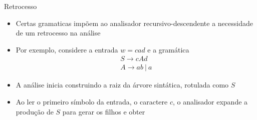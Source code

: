 \begin{frame}[fragile]{Retrocesso}

    \begin{itemize}
        \item Certas gramaticas impõem ao analisador recursivo-descendente a necessidade de um retrocesso na análise
        \pause

        \item Por exemplo, considere a entrada $w = cad$ e a gramática
        \[
            \begin{array}{l}
                S \to cAd \\
                A \to ab\ |\ a
            \end{array}
        \]
        \pause

        \item A análise inicia construindo a raiz da árvore sintática, rotulada como $S$
        \pause

        \item Ao ler o primeiro símbolo da entrada, o caractere $c$, o analisador expande a produção de $S$ para gerar os filhos e obter
        \begin{center}
        \end{center}
        
    \end{itemize}

\end{frame}

